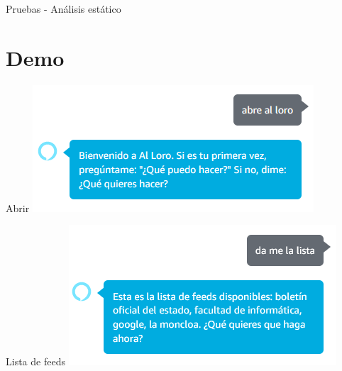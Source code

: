 \documentclass{beamer}
\begin{document}
  \begin{frame}{Pruebas - Análisis estático}
    
  \end{frame}

  \section[Demo - Skill]{Demo}

  \begin{frame}{Abrir}
    \includegraphics[width=\textwidth]{abrir.png}
  \end{frame}

  \begin{frame}{Lista de feeds}
    \includegraphics[width=\textwidth]{lista-feeds.png}
  \end{frame}
 
\end{document}
